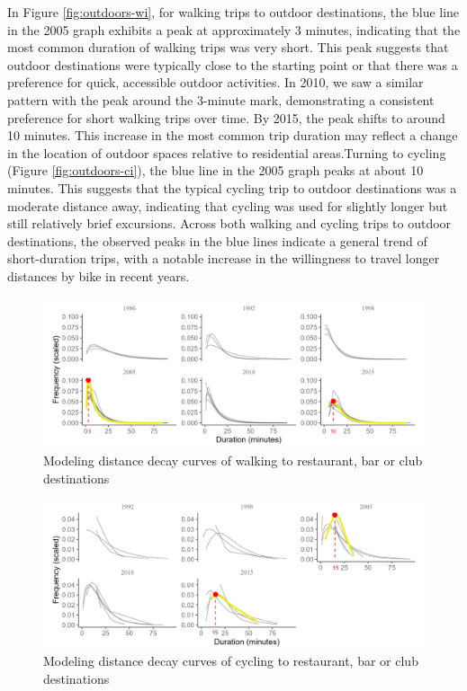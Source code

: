 \documentclass[
11pt, %
oneside, %
english, %
singlespacing, %
]{macthesis} %
\begin{document}
In Figure \ref{fig:outdoors-wi}, for walking trips to outdoor destinations, the blue line in the 2005 graph exhibits a peak at approximately 3 minutes, indicating that the most common duration of walking trips was very short. This peak suggests that outdoor destinations were typically close to the starting point or that there was a preference for quick, accessible outdoor activities. In 2010, we saw a similar pattern with the peak around the 3-minute mark, demonstrating a consistent preference for short walking trips over time. By 2015, the peak shifts to around 10 minutes. This increase in the most common trip duration may reflect a change in the location of outdoor spaces relative to residential areas.Turning to cycling (Figure \ref{fig:outdoors-ci}), the blue line in the 2005 graph peaks at about 10 minutes. This suggests that the typical cycling trip to outdoor destinations was a moderate distance away, indicating that cycling was used for slightly longer but still relatively brief excursions. Across both walking and cycling trips to outdoor destinations, the observed peaks in the blue lines indicate a general trend of short-duration trips, with a notable increase in the willingness to travel longer distances by bike in recent years.

\newpage
\thispagestyle{empty}
\begin{landscape}

\begin{figure}

{\centering \includegraphics[width=0.9\linewidth]{figure/ch03-Fig13} 

}

\caption{Modeling distance decay curves of walking to restaurant, bar or club destinations}\label{fig:restaurant-wi}
\end{figure}

\begin{figure}

{\centering \includegraphics[width=0.9\linewidth]{figure/ch03-Fig14} 

}

\caption{Modeling distance decay curves of cycling to restaurant, bar or club destinations}\label{fig:restaurant-ci}
\end{figure}
\end{landscape}
\clearpage
\end{document}
